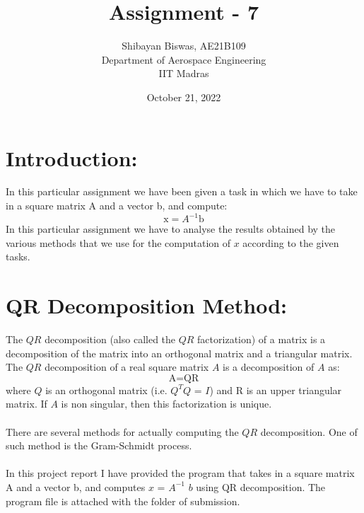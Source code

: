 \documentclass[12pt,a4paper]{article}
\author{Shibayan Biswas, AE21B109\\ Department of Aerospace Engineering\\ IIT Madras}
\title{Assignment - 7}
\date{October 21, 2022}
\begin{document}
\maketitle
\hline
\section{Introduction:}
In this particular assignment we have been given a task in which we have to take in a square matrix A and a vector b, and compute:
\begin{equation}
    \text{x} = \text{$A^{-1}$} \text{b}
\end{equation}
In this particular assignment we have to analyse the results obtained by the various methods that we use for the computation of $x$ according to the given tasks.
\section{QR Decomposition Method:}
The $QR$ decomposition (also called the $QR$ factorization) of a matrix is a decomposition of the matrix into an orthogonal matrix and a triangular matrix. The $QR$ decomposition of a real square matrix $A$ is a decomposition of $A$ as:
\begin{equation}
    \text{A} = \text{Q} \text{R}
\end{equation}
where $Q$ is an orthogonal matrix (i.e. $Q^{T}Q$ = $I$) and R is an upper triangular matrix. If $A$ is non singular, then this factorization is unique.\\
\\There are several methods for actually computing the $QR$ decomposition. One of such method is the Gram-Schmidt process.\\
\\In this project report I have provided the program that takes in a square matrix A and a vector b, and computes $x$ = $A^{-1}$ $b$ using QR decomposition. The program file is attached with the folder of submission.
\clearpage
\end{document}
